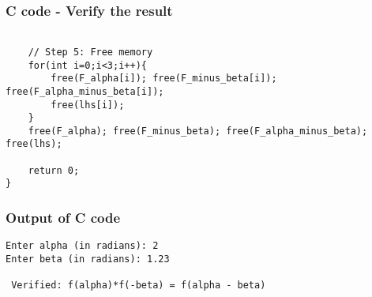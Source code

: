 \documentclass{beamer}
\begin{document}
\begin{frame}[fragile]                            
\frametitle{C code - Verify the result}                
\begin{lstlisting}

    // Step 5: Free memory
    for(int i=0;i<3;i++){
        free(F_alpha[i]); free(F_minus_beta[i]); free(F_alpha_minus_beta[i]);
        free(lhs[i]);
    }
    free(F_alpha); free(F_minus_beta); free(F_alpha_minus_beta); free(lhs);

    return 0;
}

\end{lstlisting}
\end{frame}

\begin{frame}[fragile]                            
\frametitle{Output of C code}                
\begin{lstlisting}
Enter alpha (in radians): 2
Enter beta (in radians): 1.23

 Verified: f(alpha)*f(-beta) = f(alpha - beta)

\end{lstlisting}
\end{frame}
\end{document}

